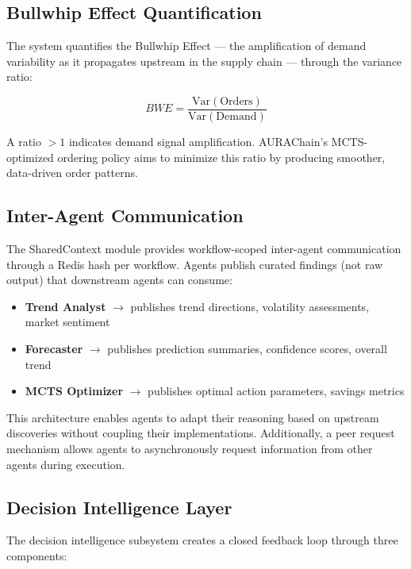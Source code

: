 \documentclass[conference]{IEEEtran}
\begin{document}
\subsection{Bullwhip Effect Quantification}

The system quantifies the Bullwhip Effect --- the amplification of demand variability as it propagates upstream in the supply chain --- through the variance ratio:

\begin{equation}
BWE = \frac{\text{Var}(\text{Orders})}{\text{Var}(\text{Demand})}
\label{eq:bullwhip}
\end{equation}

A ratio $>1$ indicates demand signal amplification. AURAChain's MCTS-optimized ordering policy aims to minimize this ratio by producing smoother, data-driven order patterns.

\subsection{Inter-Agent Communication}

The SharedContext module provides workflow-scoped inter-agent communication through a Redis hash per workflow. Agents publish curated findings (not raw output) that downstream agents can consume:

\begin{itemize}
    \item \textbf{Trend Analyst} $\rightarrow$ publishes trend directions, volatility assessments, market sentiment
    \item \textbf{Forecaster} $\rightarrow$ publishes prediction summaries, confidence scores, overall trend
    \item \textbf{MCTS Optimizer} $\rightarrow$ publishes optimal action parameters, savings metrics
\end{itemize}

This architecture enables agents to adapt their reasoning based on upstream discoveries without coupling their implementations. Additionally, a peer request mechanism allows agents to asynchronously request information from other agents during execution.

\subsection{Decision Intelligence Layer}

The decision intelligence subsystem creates a closed feedback loop through three components:
\end{document}
